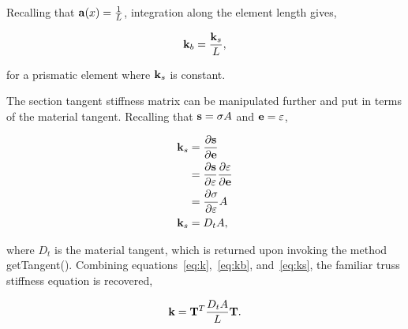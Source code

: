\documentclass[12pt]{article}
\begin{document}
\noindent Recalling that ${\bf a}(x) = \frac{1}{L}$, integration along the
element length gives,

\begin{equation}
{\bf k}_b = \label{eq:kb} \frac{{\bf k}_s}{L},
\end{equation}

\noindent for a prismatic element where ${\bf k}_s$ is constant.

The section tangent stiffness matrix can be manipulated further and put
in terms of the material tangent. Recalling that ${\bf s} = \sigma A$ and
${\bf e} = \varepsilon$,

\begin{align}
{\bf k}_s &= \frac{\partial{\bf s}}{\partial{\bf e}} \\
&= \frac{\partial{\bf s}}{\partial{\varepsilon}}\frac{\partial{\varepsilon}}{\partial{\bf e}} \\
&= \frac{\partial{\sigma}}{\partial{\varepsilon}} A \\
{\bf k}_s &= \label{eq:ks} D_t A,
\end{align}

\noindent where $D_t$ is the material tangent, which is returned upon invoking
the method getTangent(). Combining equations~\ref{eq:k},~\ref{eq:kb},
and~\ref{eq:ks}, the familiar truss stiffness equation is recovered,

\begin{equation}
{\bf k} = {\bf T}^T \frac{D_t A}{L} {\bf T}.
\end{equation}
\end{document}
